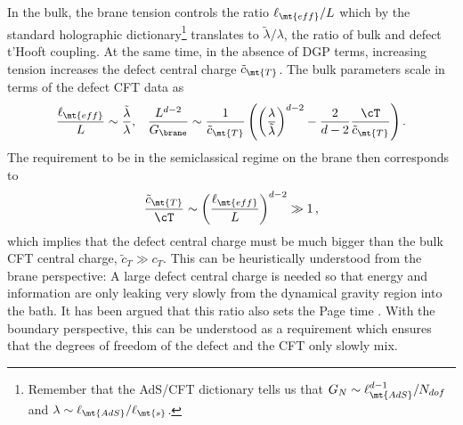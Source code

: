 In the bulk, the brane tension controls the ratio $\ell_\mt{eff}/L$ which by the standard holographic dictionary\footnote{Remember that the AdS/CFT dictionary tells us that $G_N\sim \ell_\mt{AdS}^{d-1}/ N_{dof}$ and $\lambda\sim \ell_\mt{AdS}/\ell_\mt{s}$. } translates to $\tilde \lambda/\lambda$, the ratio of bulk and defect t'Hooft coupling.  At the same time, in the absence of DGP terms, increasing tension increases the defect central charge $\tilde c_\mt{T}$. The bulk parameters scale in terms of the defect CFT data as
\begin{align}
\frac{\ell_\mt{eff}}{L} \sim \frac{\tilde \lambda}{\lambda}, &&
\frac{L^{d-2}}{G_\brane} \sim \frac 1 {\tilde c_\mt{T}}\left(\left(\frac{\lambda}{\tilde \lambda} \right)^{d-2} - \frac{2}{d-2}\frac{\cT}{\tilde c_\mt{T}}\right).
\end{align}
The requirement to be in the semiclassical regime on the brane then corresponds to
\begin{align}
\frac{\tilde c_\mt{T}}{\cT} \sim \left(\frac{\ell_\mt{eff}}{L}\right)^{d-2}\gg 1\,,
\end{align}
which implies that the defect central charge must be much bigger than the bulk CFT central charge, $\tilde c_T \gg c_T$. This can be heuristically understood from the brane perspective: A large defect central charge is needed so that energy and information are only leaking very slowly from the dynamical gravity region into the bath. It has been argued that this ratio also sets the Page time \cite{Rozali:2019day}. With the boundary perspective, this can be understood as a requirement which ensures that the degrees of freedom of the defect and the CFT only slowly mix. 


